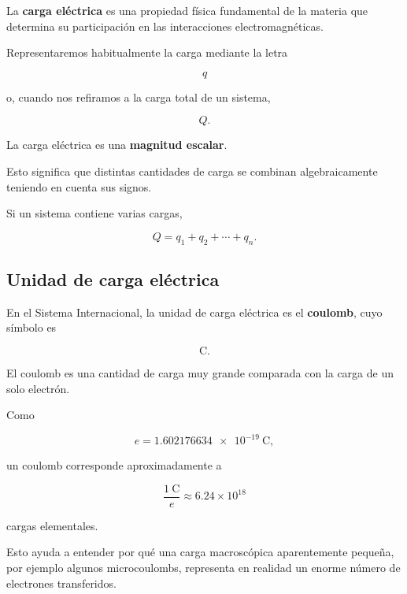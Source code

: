 \begin{definicion}
La \textbf{carga eléctrica} es una propiedad física fundamental de la materia
que determina su participación en las interacciones electromagnéticas.
\end{definicion}

Representaremos habitualmente la carga mediante la letra

\[
q
\]

o, cuando nos refiramos a la carga total de un sistema,

\[
Q.
\]

La carga eléctrica es una \textbf{magnitud escalar}.

Esto significa que distintas cantidades de carga se combinan
algebraicamente teniendo en cuenta sus signos.

Si un sistema contiene varias cargas,

\begin{equation}
    Q=q_1+q_2+\cdots+q_n.
    \label{eq:carga_total}
\end{equation}



\subsection{Unidad de carga eléctrica}

En el Sistema Internacional, la unidad de carga eléctrica es el
\textbf{coulomb}, cuyo símbolo es

\[
\si{\coulomb}.
\]

El coulomb es una cantidad de carga muy grande comparada con la carga de un
solo electrón.

Como

\[
e=\SI{1.602176634e-19}{\coulomb},
\]

un coulomb corresponde aproximadamente a

\begin{equation}
    \frac{\SI{1}{\coulomb}}{e}
    \approx
    6.24\times10^{18}
\end{equation}

cargas elementales.

\begin{interpretacion}
Esto ayuda a entender por qué una carga macroscópica aparentemente pequeña,
por ejemplo algunos microcoulombs, representa en realidad un enorme número
de electrones transferidos.
\end{interpretacion}


